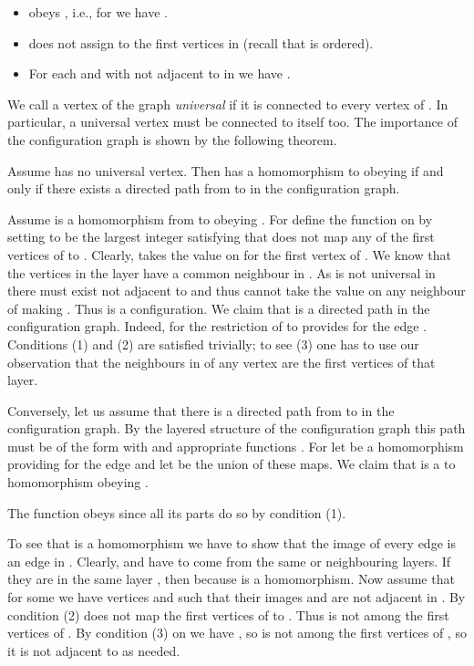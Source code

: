 \documentclass[12pt]{llncs}
\begin{document}
\begin{itemize}
\item { obeys , i.e., for  we have
  .}
  
\item{ does not assign  to the first 
  vertices in  (recall that  is ordered).}
  
\item {For each  and  with  not adjacent
  to  in  we have .}
\end{itemize}


We call a vertex of the graph  \emph{universal} if it is connected to every
vertex of . In particular, a universal vertex must be connected to itself
too. The importance of the configuration graph is shown by the following
theorem.

\begin{theorem}\label{path}
Assume  has no universal vertex. Then  has a homomorphism to  obeying
 if and only if there exists a directed path from  to 
in the configuration graph.
\end{theorem}

\begin{my_proof}
Assume  is a homomorphism from  to  obeying . For
 define the function  on  by setting  to be the largest
integer  satisfying that  does not map any of the
first  vertices of  to . Clearly,  takes the value  on
 for
the first vertex  of . We know that the vertices in the layer 
have a common neighbour  in . As  is not universal in 
there must exist  not adjacent to  and thus  cannot
take the value  on any neighbour of  making . Thus
 is a configuration. We
claim that  is a directed path in the
configuration graph. Indeed, for  the restriction of
 to  provides for the edge
. Conditions (1) and (2) are satisfied
trivially; to see (3) one has to use our observation that the
neighbours in  of any vertex  are the first
 vertices of that layer.

Conversely, let us assume that there is a directed path from  to
 in the configuration graph. By the layered structure of the
configuration graph this path must be of the form
 with  and appropriate
functions . For  let  be a homomorphism
providing for the  edge and let
 be the union of these maps. We claim that  is a  to
 homomorphism obeying .

The function  obeys  since all its parts  do so by
condition (1).

To see that  is a homomorphism we have to show that the image of every edge
 is an edge in . Clearly,  and  have to come from the same
or neighbouring layers. If they are in the same layer , then
 because  is a
homomorphism. Now assume that for some  we have
vertices  and  such that their images
 and  are not adjacent in . By
condition (2)  does not map the first  vertices
of  to . Thus  is not among the first 
vertices of . By condition (3) on  we have
, so  is not among the first  vertices
of , so it is not adjacent to  as needed.
\end{my_proof}
\end{document}
